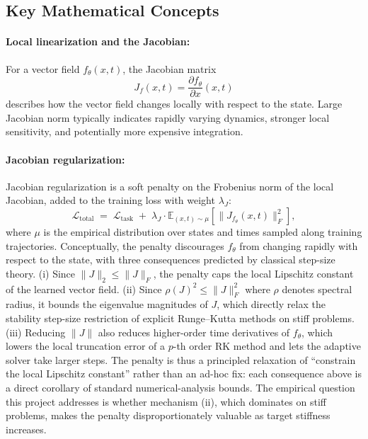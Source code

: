 \documentclass[11pt]{article}
\begin{document}
\subsection{Key Mathematical Concepts}

\paragraph{Local linearization and the Jacobian:}
For a vector field $f_{\theta}(x,t)$, the Jacobian matrix
\begin{equation}
J_f(x,t) = \frac{\partial f_{\theta}}{\partial x}(x,t)
\end{equation}
describes how the vector field changes locally with respect to the state. Large Jacobian norm typically indicates rapidly varying dynamics, stronger local sensitivity, and potentially more expensive integration.

\paragraph{Jacobian regularization:}
Jacobian regularization is a soft penalty on the Frobenius norm of the local Jacobian, added to the training loss with weight $\lambda_J$:
\begin{equation}
\mathcal{L}_{\text{total}} \;=\; \mathcal{L}_{\text{task}} \;+\; \lambda_J \cdot \mathbb{E}_{(x,t) \sim \mu}\!\left[\|J_{f_{\theta}}(x,t)\|_F^2\right],
\end{equation}
where $\mu$ is the empirical distribution over states and times sampled along training trajectories. Conceptually, the penalty discourages $f_{\theta}$ from changing rapidly with respect to the state, with three consequences predicted by classical step-size theory. (i) Since $\|J\|_2 \leq \|J\|_F$, the penalty caps the local Lipschitz constant of the learned vector field. (ii) Since $\rho(J)^2 \leq \|J\|_F^2$ where $\rho$ denotes spectral radius, it bounds the eigenvalue magnitudes of $J$, which directly relax the stability step-size restriction of explicit Runge--Kutta methods on stiff problems. (iii) Reducing $\|J\|$ also reduces higher-order time derivatives of $f_{\theta}$, which lowers the local truncation error of a $p$-th order RK method and lets the adaptive solver take larger steps. The penalty is thus a principled relaxation of ``constrain the local Lipschitz constant'' rather than an ad-hoc fix: each consequence above is a direct corollary of standard numerical-analysis bounds. The empirical question this project addresses is whether mechanism (ii), which dominates on stiff problems, makes the penalty disproportionately valuable as target stiffness increases.
\end{document}
